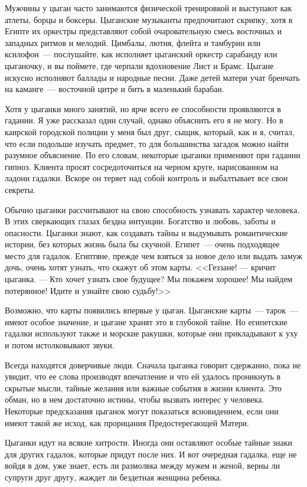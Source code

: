 \documentclass[12pt,a4paper,twoside,openany,svgnames]{memoir}
\begin{document}
Мужчины у цыган часто занимаются физической тренировкой и выступают как атлеты, борцы и боксеры. Цыганские музыканты предпочитают скрипку, хотя в Египте их оркестры представляют собой очаровательную смесь восточных и западных ритмов и мелодий. Цимбалы, лютня, флейта и тамбурин или ксилофон~--- послушайте, как исполняет цыганский оркестр сарабанду или цыганочку, и вы поймете, где черпали вдохновение Лист и Брамс. Цыгане искусно исполняют баллады и народные песни. Даже детей матери учат бренчать на каманге~--- восточной цитре и бить в маленький барабан.

Хотя у цыганки много занятий, но ярче всего ее способности проявляются в гадании. Я уже рассказал один случай, однако объяснить его я не могу. Но в каирской городской полиции у меня был друг, сыщик, который, как и я, считал, что если подольше изучать предмет, то для большинства загадок можно найти разумное объяснение. По его словам, некоторые цыганки применяют при гадании гипноз. Клиента просят сосредоточиться на черном круге, нарисованном на ладони гадалки. Вскоре он теряет над собой контроль и выбалтывает все свои секреты.

Обычно цыганки рассчитывают на свою способность узнавать характер человека. В этих сверкающих глазах бездна интуиции. Богатство и любовь, заботы и опасности. Цыганки знают, как создавать тайны и выдумывать романтические истории, без которых жизнь была бы скучной. Египет~--- очень подходящее место для гадалок. Египтяне, прежде чем взяться за новое дело или выдать замуж дочь, очень хотят узнать, что скажут об этом карты. <<Геззане! --- кричит цыганка. --- Кто хочет узнать свое будущее? Мы покажем хорошее! Мы найдем потерянное! Идите и узнайте свою судьбу!>>

Возможно, что карты появились впервые у цыган. Цыганские карты~--- тарок~--- имеют особое значение, и цыгане хранят это в глубокой тайне. Но египетские гадалки используют также и морские ракушки, которые они прикладывают к уху и потом истолковывают звуки.

Всегда находятся доверчивые люди. Сначала цыганка говорит сдержанно, пока не увидит, что ее слова производят впечатление и что ей удалось проникнуть в скрытые мысли, тайные желания или важные события в жизни клиента. Это обман, но в нем достаточно истины, чтобы вызвать интерес у человека. Некоторые предсказания цыганок могут показаться ясновидением, если они имеют такой же исход, как прорицания Предостерегающей Матери.

Цыганки идут на всякие хитрости. Иногда они оставляют особые тайные знаки для других гадалок, которые придут после них. И вот очередная гадалка, еще не войдя в дом, уже знает, есть ли размолвка между мужем и женой, верны ли супруги друг другу, жаждет ли бездетная женщина ребенка.
\end{document}
